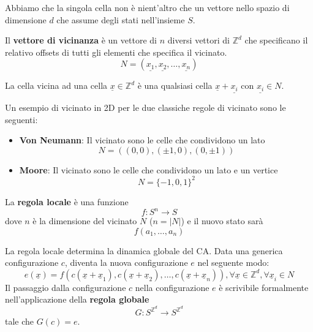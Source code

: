 Abbiamo che la singola cella non è nient'altro che un vettore nello spazio di dimensione 
$d$ che assume degli stati nell'insieme $S$.

\begin{definizione}
    Il \textbf{vettore di vicinanza} è un vettore di $n$ diversi vettori di $\mathbb{Z}^d$
    che specificano il relativo offsets di tutti gli elementi che specifica il 
    vicinato.
    $$N=\left(\underline{x_1},\underline{x_2},\dots,\underline{x_n}\right)$$
\end{definizione}

La cella vicina ad una cella $\underline{x }\in \mathbb{Z}^d$ è una qualsiasi cella $\underline{x}+\underline{x_i}$ 
con $\underline{x_i} \in N$.

\begin{esempio}
    Un esempio di vicinato in 2D per le due classiche regole di vicinato sono 
    le seguenti:
    \begin{itemize}
        \item \textbf{Von Neumann}: Il vicinato sono le celle che condividono un 
        lato
        $$N=\left(\left(0,0\right),\left(\pm 1,0\right), \left(0,\pm 1\right)\right)$$
        \item \textbf{Moore}: Il vicinato sono le celle che condividono un 
        lato e un vertice
        $$N=\{-1,0,1\}^2$$
    \end{itemize}
\end{esempio}

\begin{definizione}
    La \textbf{regola locale} è una funzione 
    $$f:S^n\rightarrow S$$
    dove $n$ è la dimensione del vicinato $N$ ($n=|N|$) e il nuovo stato sarà
    $$f(a_1,\dots,a_n)$$
\end{definizione}

\begin{definizione}
    La regola locale determina la dinamica globale del CA. Data una generica 
    configurazione $c$, diventa la nuova configurazione $e$ nel seguente modo:
    $$e(\underline{x}) = f(c(\underline{x}+ \underline{x}_1),c(\underline{x}+ \underline{x}_2),\dots, c(\underline{x}+ \underline{x}_n)), \forall \underline{x}\in \mathbb{Z}^d, \forall \underline{x}_i\in N$$
    Il passaggio dalla configurazione $c$ nella configurazione $e$ è scrivibile 
    formalmente nell'applicazione della \textbf{regola globale}
    $$G:S^{\mathbb{Z}^d}\rightarrow S^{\mathbb{Z}^d} $$
    tale che $G(c) = e$.
\end{definizione}

